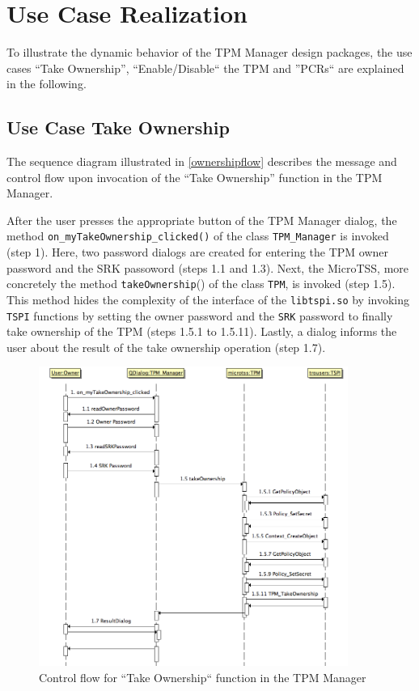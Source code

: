 \documentclass[
  american        %
]{sirrixreport}
\begin{document}
\section{Use Case Realization} 
\label{sec:usecase}
To illustrate the dynamic behavior of the TPM Manager design packages, the use cases ``Take Ownership'', ``Enable/Disable`` the TPM and ''PCRs`` are
explained in the following.

\subsection{Use Case Take Ownership}
\label{sec:takeowner}
The sequence diagram illustrated in \autoref{ownershipflow} describes the message and
control flow upon invocation of the ``Take Ownership'' function in the TPM Manager.

After the user presses the appropriate button of the TPM Manager dialog, the method \lstinline'on_myTakeOwnership_clicked()'
of the class \lstinline'TPM_Manager' is invoked (step 1). Here, two password dialogs are created for entering
the TPM owner password and the SRK passoword (steps 1.1 and 1.3). Next, the MicroTSS,
more concretely the method \lstinline'takeOwnership'() of the class \lstinline'TPM', is invoked (step 1.5). This method
hides the complexity of the interface of the \lstinline'libtspi.so' by invoking \lstinline'TSPI' functions by setting the owner password and the \lstinline'SRK' password to finally take ownership of the TPM (steps 1.5.1 to 1.5.11). Lastly, a dialog informs the user about the result 
of the take ownership operation (step 1.7).

\begin{figure}[h]
 \centering
 \includegraphics[width=0.9\textwidth]{images/arch_takeownerflow}
 \caption{Control flow for ``Take Ownership`` function in the TPM Manager}
 \label{ownershipflow}
\end{figure}
\clearpage
\end{document}
